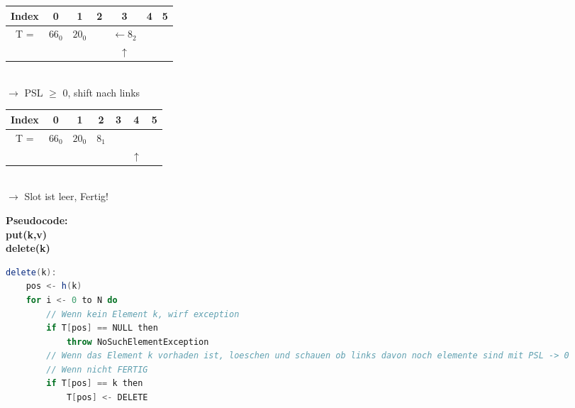 \begin{multicols}{2}
\begin{center}
\begin{tabular}{|c|c|c|c|c|c|c|}
\hline
Index & 0 & 1 & 2 & 3 & 4 & 5\\
\hline
T = & $66_0$ & $20_0$ &  & $\leftarrow 8_2$ & &\\
\hline
&  &  &  & $\uparrow$ & &\\
\hline
\end{tabular}\\
$\rightarrow$ PSL $\geq$ 0, shift nach links\\
\end{center}

\begin{center}
\begin{tabular}{|c|c|c|c|c|c|c|}
\hline
Index & 0 & 1 & 2 & 3 & 4 & 5\\
\hline
T = & $66_0$ & $20_0$ & $8_1$ &  & &\\
\hline
&  &  &  &  & $\uparrow$ &\\
\hline
\end{tabular}\\
$\rightarrow$ Slot ist leer, Fertig!\\
\end{center}
\end{multicols}



\noindent
\textbf{Pseudocode:}\\

\textbf{put(k,v)}\\


\textbf{delete(k)}\\

\begin{lstlisting}[language=Scala]
delete(k):
	pos <- h(k)
	for i <- 0 to N do
		// Wenn kein Element k, wirf exception
		if T[pos] == NULL then
			throw NoSuchElementException
		// Wenn das Element k vorhaden ist, loeschen und schauen ob links davon noch elemente sind mit PSL -> 0
		// Wenn nicht FERTIG		
		if T[pos] == k then
			T[pos] <- DELETE
\end{lstlisting}